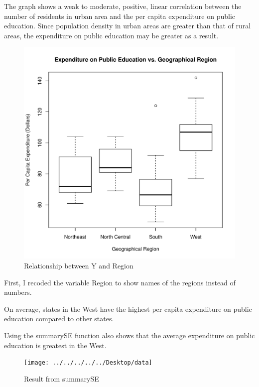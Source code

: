 \documentclass[12pt,letterpaper]{article}
\begin{document}
\begin{itemize}
The graph shows a weak to moderate, positive, linear correlation between the number of residents in urban area and the per capita expenditure on public education. Since population density in urban areas are greater than that of rural areas, the expenditure on public education may be greater as a result.
\newpage 
\begin{figure} [h]
	\centering
	\includegraphics[width=0.7\linewidth]{Graph3}
	\caption{Relationship between Y and Region}
	\label{fig:graph2}
\end{figure}



\noindent First, I recoded the variable Region to show names of the regions instead of numbers.



\noindent On average, states in the West have the highest per capita expenditure on public education compared to other states. 

\vspace{0.5cm}

\noindent Using the summarySE function also shows that the average expenditure on public education is greatest in the West.



\begin{figure} [h]
	\centering
	\texttt{[image: ../../../../../Desktop/data]}
	\caption{Result from summarySE}
	\label{fig:data}
\end{figure}


\end{itemize}
\end{document}
